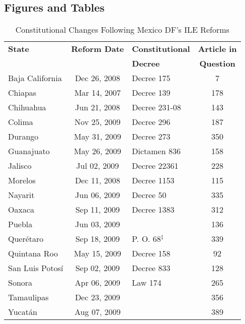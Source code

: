 \documentclass[a4paper,11pt]{article}
\begin{document}
\begin{spacing}{1.5}
\section*{Figures and Tables}
\begin{table}[htpb!]
  \caption{Constitutional Changes Following Mexico DF's ILE Reforms}
  \begin{center}
    \begin{tabular}{lclc} \toprule
      \textbf{State} & \textbf{Reform Date} & \textbf{Constitutional} & \textbf{Article in} \\
      &                      & \textbf{Decree}         & \textbf{Question} \\ \midrule
      Baja California  &       Dec 26, 2008  & Decree 175    & 7   \\
      Chiapas          &       Mar 14, 2007     & Decree 139    & 178 \\
      Chihuahua        &       Jun 21, 2008      & Decree 231-08 & 143 \\
      Colima           &       Nov 25, 2009  & Decree 296    & 187 \\
      Durango          &       May 31, 2009       & Decree 273    & 350 \\
      Guanajuato       &       May 26, 2009       & Dictamen 836  & 158 \\
      Jalisco          &       Jul 02, 2009       & Decree 22361  & 228 \\
      Morelos          &       Dec 11, 2008  & Decree 1153   & 115 \\
      Nayarit          &       Jun 06, 2009       & Decree 50     & 335 \\
      Oaxaca           &       Sep 11, 2009 & Decree 1383   & 312 \\
      Puebla           &       Jun 03, 2009 &               & 136 \\
      Quer\'etaro      &       Sep 18, 2009 &  P. O. 68$^\ddagger$    &   339 \\
      Quintana Roo     &       May 15, 2009 &  Decree 158   & 92  \\
      San Luis Potos\'i&       Sep 02, 2009  & Decree 833   & 128 \\
      Sonora           &       Apr 06, 2009  &   Law 174    & 265 \\
      Tamaulipas       &       Dec 23, 2009  &               & 356 \\
      Yucat\'an        &       Aug 07, 2009     &               & 389 \\

\end{tabular}
\end{center}
\end{table}
\end{spacing}
\end{document}
